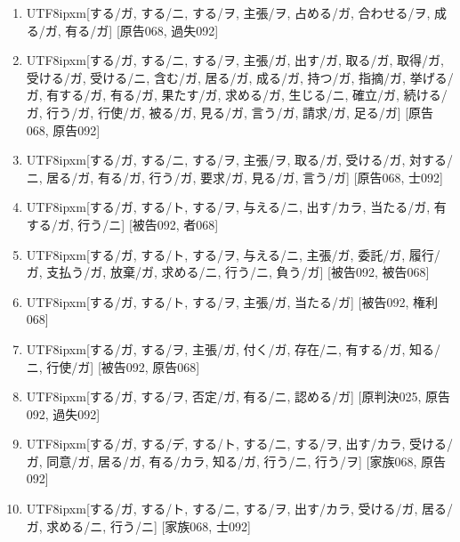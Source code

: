 \begin{enumerate}
\item \begin{CJK}{UTF8}{ipxm}[する/ガ, する/ニ, する/ヲ, 主張/ヲ, 占める/ガ, 合わせる/ヲ, 成る/ガ, 有る/ガ] [原告068, 過失092]\end{CJK}
\item \begin{CJK}{UTF8}{ipxm}[する/ガ, する/ニ, する/ヲ, 主張/ガ, 出す/ガ, 取る/ガ, 取得/ガ, 受ける/ガ, 受ける/ニ, 含む/ガ, 居る/ガ, 成る/ガ, 持つ/ガ, 指摘/ガ, 挙げる/ガ, 有する/ガ, 有る/ガ, 果たす/ガ, 求める/ガ, 生じる/ニ, 確立/ガ, 続ける/ガ, 行う/ガ, 行使/ガ, 被る/ガ, 見る/ガ, 言う/ガ, 請求/ガ, 足る/ガ] [原告068, 原告092]\end{CJK}
\item \begin{CJK}{UTF8}{ipxm}[する/ガ, する/ニ, する/ヲ, 主張/ヲ, 取る/ガ, 受ける/ガ, 対する/ニ, 居る/ガ, 有る/ガ, 行う/ガ, 要求/ガ, 見る/ガ, 言う/ガ] [原告068, 士092]\end{CJK}
\item \begin{CJK}{UTF8}{ipxm}[する/ガ, する/ト, する/ヲ, 与える/ニ, 出す/カラ, 当たる/ガ, 有する/ガ, 行う/ニ] [被告092, 者068]\end{CJK}
\item \begin{CJK}{UTF8}{ipxm}[する/ガ, する/ト, する/ヲ, 与える/ニ, 主張/ガ, 委託/ガ, 履行/ガ, 支払う/ガ, 放棄/ガ, 求める/ニ, 行う/ニ, 負う/ガ] [被告092, 被告068]\end{CJK}
\item \begin{CJK}{UTF8}{ipxm}[する/ガ, する/ト, する/ヲ, 主張/ガ, 当たる/ガ] [被告092, 権利068]\end{CJK}
\item \begin{CJK}{UTF8}{ipxm}[する/ガ, する/ヲ, 主張/ガ, 付く/ガ, 存在/ニ, 有する/ガ, 知る/ニ, 行使/ガ] [被告092, 原告068]\end{CJK}
\item \begin{CJK}{UTF8}{ipxm}[する/ガ, する/ヲ, 否定/ガ, 有る/ニ, 認める/ガ] [原判決025, 原告092, 過失092]\end{CJK}
\item \begin{CJK}{UTF8}{ipxm}[する/ガ, する/デ, する/ト, する/ニ, する/ヲ, 出す/カラ, 受ける/ガ, 同意/ガ, 居る/ガ, 有る/カラ, 知る/ガ, 行う/ニ, 行う/ヲ] [家族068, 原告092]\end{CJK}
\item \begin{CJK}{UTF8}{ipxm}[する/ガ, する/ト, する/ニ, する/ヲ, 出す/カラ, 受ける/ガ, 居る/ガ, 求める/ニ, 行う/ニ] [家族068, 士092]\end{CJK}

\end{enumerate}
